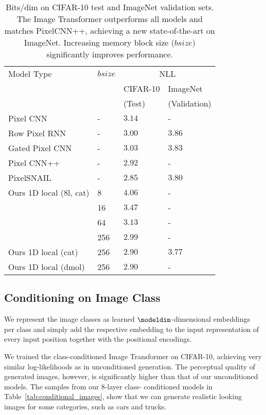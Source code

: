 \begin{table}%
\centering
\caption{Bits/dim on CIFAR-10 test and ImageNet validation sets. The Image Transformer outperforms all models and matches PixelCNN++, achieving a new state-of-the-art on ImageNet. Increasing memory block size ($bsize$) significantly improves performance.}
\vspace{2mm}

\begin{tabular}{llll}
Model Type & $bsize$ & \multicolumn{2}{c}{NLL}  \\
 & & CIFAR-10 & ImageNet \\
 & & (Test) & (Validation) \\
\hline
Pixel CNN & - & $3.14$ & -\\
Row Pixel RNN & - &  $3.00$ & $3.86$ \\
Gated Pixel CNN & - & $3.03$ & $3.83$\\
Pixel CNN++ & - & $2.92$ & -\\
PixelSNAIL & - & $\mathbf{2.85}$ & $3.80$\\
\hline
Ours 1D local (8l, cat) & 8 & $4.06$ & - \\
 & 16 & $3.47$ & - \\
 & 64 & $3.13$ & - \\
 & 256 & $2.99$ & - \\ %
\hline
Ours 1D local (cat) & 256 & $2.90$ & $\mathbf{3.77}$ \\
Ours 1D local (dmol) & 256 & $2.90$ & -
\label{tab:generative-log-probs}

\end{tabular}
\end{table}

\subsection{Conditioning on Image Class}
We represent the image classes as learned $\modeldim$-dimensional embeddings per class and simply add the respective embedding to the input representation of every input position together with the positional encodings.

We trained the class-conditioned Image Transformer on CIFAR-10, achieving very similar log-likelihoods as in unconditioned generation. The perceptual quality of generated images, however, is significantly higher than that of our unconditioned models. The samples from our $8$-layer class- conditioned models in Table~\ref{tab:conditional_images}, show that we can generate realistic looking images for some categories, such as cars and trucks.


